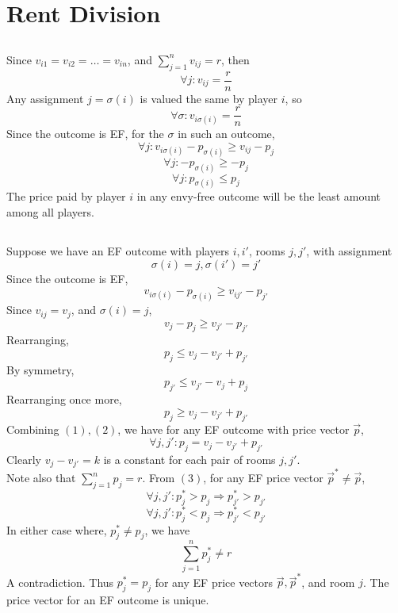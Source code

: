 

\renewcommand{\thesection}{}
\renewcommand{\thesubsection}{\arabic{subsection}}
\renewcommand{\thesubsubsection}{\alph{subsubsection}}




\section{Rent Division}

\subsection{}
Since $v_{i1}=v_{i2}=\dots=v_{in}$, and $\sum_{j=1}^n v_{ij}=r$, then
\[\forall j: v_{ij} = \frac{r}{n}\]
Any assignment $j=\sigma(i)$ is valued the same by player $i$, so
\[\forall \sigma : v_{i\sigma(i)}=\frac{r}{n}\]
Since the outcome is EF, for the $\sigma$ in such an outcome,
\[\forall j: v_{i\sigma(i)}-p_{\sigma(i)}\geq v_{ij}-p_j\]
\[\forall j: -p_{\sigma(i)}\geq-p_j\]
\[\forall j: p_{\sigma(i)} \leq p_j\]
The price paid by player $i$ in any envy-free outcome
will be the least amount among all players.

\newpage
\subsection{}
Suppose we have an EF outcome with players $i,i'$, rooms $j,j'$,
with assignment 
\[\sigma(i)=j, \sigma(i')=j'\]
Since the outcome is EF,
\[v_{i\sigma(i)}-p_{\sigma(i)}\geq v_{ij'}-p_{j'}\]
Since $v_{ij}=v_j$, and $\sigma(i)=j$,
\[v_{j}-p_{j}\geq v_{j'}-p_{j'}\]
Rearranging,
\begin{equation}
    p_j \leq v_j-v_{j'} +p_{j'}
\end{equation}
By symmetry,
\[p_{j'} \leq v_{j'}-v_{j} +p_{j}\]
Rearranging once more,
\begin{equation}
    p_j \geq v_j-v_{j'} +p_{j'}
\end{equation}
Combining $(1),(2)$, we have for any EF outcome with price vector $\vec{p}$,
\begin{equation}
    \forall j, j':p_j=v_j-v_{j'}+p_{j'}
\end{equation}
Clearly $v_j-v_{j'}=k$ is a constant for each pair of rooms $j,j'$.\\
Note also that $\sum_{j=1}^n p_j = r$.
From $(3)$, for any EF price vector $\vec{p}^*\neq \vec{p}$,
\[\forall j, j': p_j^*>p_j \Rightarrow p_{j'}^* > p_{j'}\]
\[\forall j, j': p_j^*<p_j \Rightarrow p_{j'}^* < p_{j'}\]
In either case where, $p_j^*\neq p_j$, we have 
\[\sum_{j=1}^n p_j^* \neq r\]
A contradiction. 
Thus $p_j^*=p_j$ for any EF price vectors $\vec{p},\vec{p}^*$,
and room $j$. The price vector for an EF outcome is unique.

